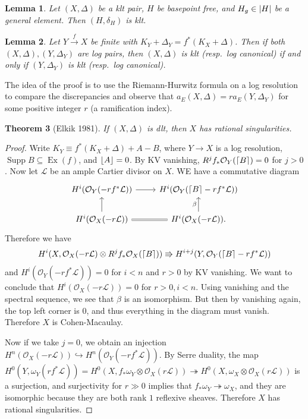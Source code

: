 \documentclass[leqno, openany]{memoir}
\DeclarePairedDelimiter{\floor}{\lfloor}{\rfloor}
\DeclarePairedDelimiter{\ceil}{\lceil}{\rceil}
\newtheorem{thm}{Theorem}[section]
\newtheorem{lem}[thm]{Lemma}
\theoremstyle{definition}
\theoremstyle{remark}
\theoremstyle{plain}
\theoremstyle{definition}
\theoremstyle{remark}
\newcommand{\mc}[1]{\mathcal{#1}}
\DeclareMathOperator{\Supp}{Supp}
\begin{document}
\begin{lem}
    Let $(X, \Delta)$ be a klt pair, $H$ be basepoint free, and $H_g \in \abs{H}$ be a general element. Then $(H, \delta_H)$ is klt.
\end{lem}

\begin{lem}
    Let $Y \xrightarrow{f} X$ be finite with $K_Y + \Delta_Y = f^*(K_X + \Delta)$. Then if both $(X, \Delta), (Y, \Delta_Y)$ are log pairs, then $(X, \Delta)$ is klt (resp.~log canonical) if and only if $(Y, \Delta_Y)$ is klt (resp.~log canonical).
\end{lem}

The idea of the proof is to use the Riemann-Hurwitz formula on a log resolution to compare the discrepancies and observe that $a_E(X, \Delta) = ra_E(Y, \Delta_Y)$ for some positive integer $r$ (a ramification index).

\begin{thm}[Elkik 1981]
    If $(X, \Delta)$ is dlt, then $X$ has rational singularities.
\end{thm}

\begin{proof}
    Write $K_Y \equiv f^*(K_X + \Delta) + A - B$, where $Y \to X$ is a log resolution, $\Supp B \subseteq \operatorname{Ex}(f)$, and $\floor{A} = 0$. By KV vanishing, $R^j f_* \mc{O}_Y(\ceil{B}) = 0$ for $j > 0$. Now let $\mc{L}$ be an ample Cartier divisor on $X$. WE have a commutative diagram
    \begin{equation*}
    \begin{tikzcd}
        H^i(\mc{O}_Y(-rf^* \mc{L})) \ar{r} & H^i(\mc{O}_Y(\ceil{B} - rf^* \mc{L})) \\
        H^i(\mc{O}_X(-r\mc{L})) \ar{u} \ar[equal]{r} & H^i(\mc{O}_X(-r\mc{L})). \ar{u}{\beta}
    \end{tikzcd}
    \end{equation*}
    Therefore we have
    \[ H^i(X, \mc{O}_X(-r\mc{L}) \otimes R^j f_* \mc{O}_X(\ceil{B})) \Rrightarrow H^{i+j}(Y, \mc{O}_Y(\ceil{B} - rf^*\mc{L})) \]
    and $H^i(\mc{O}_Y(-rf^* \mc{L})) = 0$ for $i < n$ and $r > 0$ by KV vanishing. We want to conclude that $H^i(\mc{O}_X(-r\mc{L})) = 0$ for $r > 0, i < n$. Using vanishing and the spectral sequence, we see that $\beta$ is an isomorphism. But then by vanishing again, the top left corner is $0$, and thus everything in the diagram must vanish. Therefore $X$ is Cohen-Macaulay.

    Now if we take $j = 0$, we obtain an injection $H^n(\mc{O}_X(-r\mc{L})) \hookrightarrow H^n(\mc{O}_Y(-rf^*\mc{L}))$. By Serre duality, the map $H^0(Y, \omega_Y(rf^*\mc{L})) = H^0(X, f_*\omega_Y \otimes \mc{O}_X(r\mc{L})) \twoheadrightarrow H^0(X, \omega_X \otimes \mc{O}_X(r\mc{L}))$ is a surjection, and surjectivity for $r \gg 0$ implies that $f_* \omega_Y \twoheadrightarrow \omega_X$, and they are isomorphic because they are both rank $1$ reflexive sheaves. Therefore $X$ has rational singularities.
\end{proof}
\end{document}
